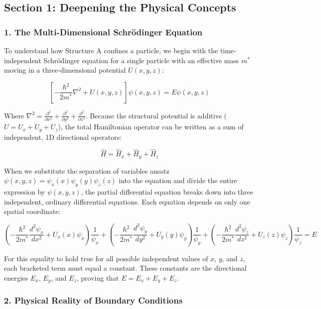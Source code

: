 \documentclass[
]{article}
\begin{document}
\subsection{Section 1: Deepening the Physical
Concepts}\label{section-1-deepening-the-physical-concepts}

\subsubsection{1. The Multi-Dimensional Schrödinger
Equation}\label{the-multi-dimensional-schruxf6dinger-equation}

To understand how Structure A confines a particle, we begin with the
time-independent Schrödinger equation for a single particle with an
effective mass \(m^*\) moving in a three-dimensional potential
\(U(x,y,z)\):

\[\left[ -\frac{\hbar^2}{2m^*} \nabla^2 + U(x,y,z) \right] \psi(x,y,z) = E\psi(x,y,z)\]

Where
\(\nabla^2 = \frac{\partial^2}{\partial x^2} + \frac{\partial^2}{\partial y^2} + \frac{\partial^2}{\partial z^2}\).
Because the structural potential is additive (\(U = U_x + U_y + U_z\)),
the total Hamiltonian operator can be written as a sum of independent,
1D directional operators:

\[\hat{H} = \hat{H}_x + \hat{H}_y + \hat{H}_z\]

When we substitute the separation of variables ansatz
\(\psi(x,y,z) = \psi_x(x)\psi_y(y)\psi_z(z)\) into the equation and
divide the entire expression by \(\psi(x,y,z)\), the partial
differential equation breaks down into three independent, ordinary
differential equations. Each equation depends on only one spatial
coordinate:

\[\left( -\frac{\hbar^2}{2m^*}\frac{d^2\psi_x}{dx^2} + U_x(x)\psi_x \right) \frac{1}{\psi_x} + \left( -\frac{\hbar^2}{2m^*}\frac{d^2\psi_y}{dy^2} + U_y(y)\psi_y \right) \frac{1}{\psi_y} + \left( -\frac{\hbar^2}{2m^*}\frac{d^2\psi_z}{dz^2} + U_z(z)\psi_z \right) \frac{1}{\psi_z} = E\]

For this equality to hold true for all possible independent values of
\(x\), \(y\), and \(z\), each bracketed term must equal a constant.
These constants are the directional energies \(E_x\), \(E_y\), and
\(E_z\), proving that \(E = E_x + E_y + E_z\).

\subsubsection{2. Physical Reality of Boundary
Conditions}\label{physical-reality-of-boundary-conditions}
\end{document}
